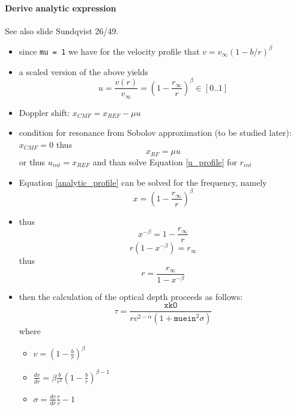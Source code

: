 \documentclass[../main/main.tex]{subfiles}
\begin{document}
\paragraph{Derive analytic expression} See also slide Sundqvist 26/49. 

\begin{itemize}
\item since \texttt{mu = 1} we have for the velocity profile that $v = v_{\infty}(1-b/r)^{\beta}$
\item a scaled version of the above yields 
\begin{equation}
u = \frac{v(r)}{v_{\infty}} = \left(1 - \frac{r_{\infty}}{r} \right)^{\beta} \in [0..1] 
\label{u_profile}
\end{equation}
\item Doppler shift: $x_{CMF} = x_{REF} - \mu u$
\item condition for resonance from Sobolov approximation (to be studied later): $x_{CMF}= 0$ thus 
\begin{equation}
x_{RF} = \mu u
\label{analytic_profile}
\end{equation}
or thus $u_{int} = x_{REF}$ and than solve Equation \ref{u_profile} for $r_{int}$
\item Equation \ref{analytic_profile} can be solved for the frequency, namely 
\begin{equation}
x = \left(1 - \frac{r_{\infty}}{r} \right)^{\beta}
\end{equation}
\item thus 
\begin{equation*}
x^{-\beta} = 1 - \frac{r_{\infty}}{r}
\end{equation*}
\begin{equation*}
r(1-x^{-\beta}) = r_{\infty}
\end{equation*}
thus \begin{equation}
r = \frac{r_{\infty}}{1-x^{-\beta}}
\end{equation}
\item then the calculation of the optical depth proceeds as follows:
\begin{equation}
\tau = \frac{\texttt{xkO}}{rv^{2-\alpha}(1+\texttt{muein}^2 \sigma)}
\end{equation}
where
\begin{itemize}
\item $v = \left(1 - \frac{b}{r} \right)^{\beta} $
\item $\frac{dv}{dr} = \beta \frac{b}{r^2}\left( 1 - \frac{b}{r} \right)^{\beta - 1}$
\item $\sigma = \frac{dv}{dr}\frac{r}{v}-1$
\end{itemize}
\end{itemize}
\end{document}
